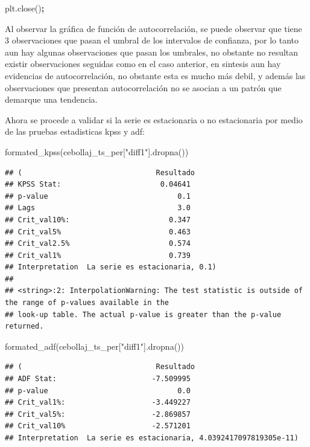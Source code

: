 \documentclass[
]{book}
\newenvironment{Shaded}{\begin{snugshade}}{\end{snugshade}}
\newcommand{\NormalTok}[1]{#1}
\newcommand{\OperatorTok}[1]{\textcolor[rgb]{0.81,0.36,0.00}{\textbf{#1}}}
\newcommand{\StringTok}[1]{\textcolor[rgb]{0.31,0.60,0.02}{#1}}
\begin{document}
\begin{Shaded}
\begin{Highlighting}[]
\NormalTok{plt.close()}\OperatorTok{;}
\end{Highlighting}
\end{Shaded}

Al observar la gráfica de función de autocorrelación, se puede observar que tiene 3 observaciones que pasan el umbral de los intervalos de confianza, por lo tanto aun hay algunas observaciones que pasan los umbrales, no obstante no resultan existir observaciones seguidas como en el caso anterior, en sintesis aun hay evidencias de autocorrelación, no obstante esta es mucho más debil, y además las observaciones que presentan autocorrelación no se asocian a un patrón que demarque una tendencia.

Ahora se procede a validar si la serie es estacionaria o no estacionaria por medio de las pruebas estadisticas kpss y adf:

\begin{Shaded}
\begin{Highlighting}[]

\NormalTok{formated\_kpss(cebollaj\_ts\_per[}\StringTok{"diff1"}\NormalTok{].dropna())}
\end{Highlighting}
\end{Shaded}

\begin{verbatim}
## (                               Resultado
## KPSS Stat:                       0.04641
## p-value                              0.1
## Lags                                 3.0
## Crit_val10%:                       0.347
## Crit_val5%                         0.463
## Crit_val2.5%                       0.574
## Crit_val1%                         0.739
## Interpretation  La serie es estacionaria, 0.1)
## 
## <string>:2: InterpolationWarning: The test statistic is outside of the range of p-values available in the
## look-up table. The actual p-value is greater than the p-value returned.
\end{verbatim}

\begin{Shaded}
\begin{Highlighting}[]
\NormalTok{formated\_adf(cebollaj\_ts\_per[}\StringTok{"diff1"}\NormalTok{].dropna())}
\end{Highlighting}
\end{Shaded}

\begin{verbatim}
## (                               Resultado
## ADF Stat:                      -7.509995
## p-value                              0.0
## Crit_val1%:                    -3.449227
## Crit_val5%:                    -2.869857
## Crit_val10%                    -2.571201
## Interpretation  La serie es estacionaria, 4.0392417097819305e-11)
\end{verbatim}
\end{document}
